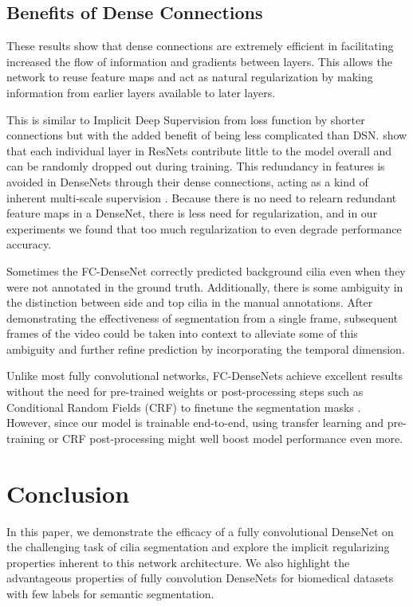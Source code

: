 \documentclass{llncs}
\begin{document}
\subsection{Benefits of Dense Connections}
These results show that dense connections are extremely efficient in facilitating increased the flow of information and gradients between layers. This allows the network to reuse feature maps and act as natural regularization by making information from earlier layers available to later layers. 
\par
This is similar to  Implicit Deep Supervision from loss function by shorter connections but with the added benefit of being less complicated than DSN. \cite{Stochastic} show that each individual layer in ResNets \cite{ResNet} contribute little to the model overall and can be randomly dropped out during training. This redundancy in features is avoided in DenseNets through their dense connections, acting as a kind of inherent multi-scale supervision \cite{DSN}. Because there is no need to relearn redundant feature maps in a DenseNet, there is less need for regularization, and in our experiments we found that too much regularization to even degrade performance accuracy. 
 \par
Sometimes the FC-DenseNet correctly predicted background cilia even when they were not annotated in the ground truth. Additionally, there is some ambiguity in the distinction between side and top cilia in the manual annotations. After demonstrating the effectiveness of segmentation from a single frame, subsequent frames of the video could be taken into context to alleviate some of this ambiguity and further refine prediction by incorporating the temporal dimension. 
 \par
Unlike most fully convolutional networks, FC-DenseNets achieve excellent results without the need for pre-trained weights or post-processing steps such as Conditional Random Fields (CRF) to finetune the segmentation masks  \cite{DeepLab,CRF}. However, since our model is trainable end-to-end, using transfer learning \cite{Transfer} and pre-training or CRF post-processing might well boost model performance even more.  


\section{Conclusion}
In this paper, we demonstrate the efficacy of a fully convolutional DenseNet on the challenging task of cilia segmentation and explore the implicit regularizing properties inherent to this network architecture.  We also highlight the advantageous properties of fully convolution DenseNets for biomedical datasets with few labels for semantic segmentation.
\end{document}
